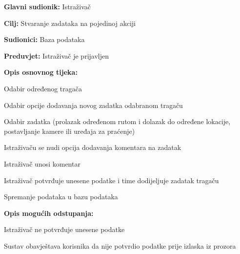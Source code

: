					
					
					\noindent {}
					\begin{packed_item}
						
						\item \textbf{Glavni sudionik: }Istraživač
						\item  \textbf{Cilj:} Stvaranje zadataka na pojedinoj akciji
						\item  \textbf{Sudionici:} Baza podataka
						\item  \textbf{Preduvjet:} Istraživač je prijavljen
						\item  \textbf{Opis osnovnog tijeka:}
						
						\item[] \begin{packed_enum}
							
							\item Odabir određenog tragača
							\item Odabir opcije dodavanja novog zadatka odabranom tragaču
							\item Odabir zadatka (prolazak određenom rutom i dolazak do određene lokacije, postavljanje
							kamere ili uređaja za praćenje)
							\item Istraživaču se nudi opcija dodavanja komentara na zadatak
							\item Istraživač unosi komentar
							\item Istraživač potvrđuje unesene podatke i time dodijeljuje zadatak tragaču
							\item Spremanje podataka u bazu podataka
						\end{packed_enum}
						
						\item  \textbf{Opis mogućih odstupanja:}
						
						\item[] \begin{packed_item}
							
							
							\item[6.a] Istraživač ne potvrđuje unesene podatke
							\item[] \begin{packed_enum}
								
								\item Sustav obavještava korisnika da nije potvrdio podatke prije izlaska iz prozora
								
								\end{packed_enum}
							
						\end{packed_item}
						
					\end{packed_item}
					
